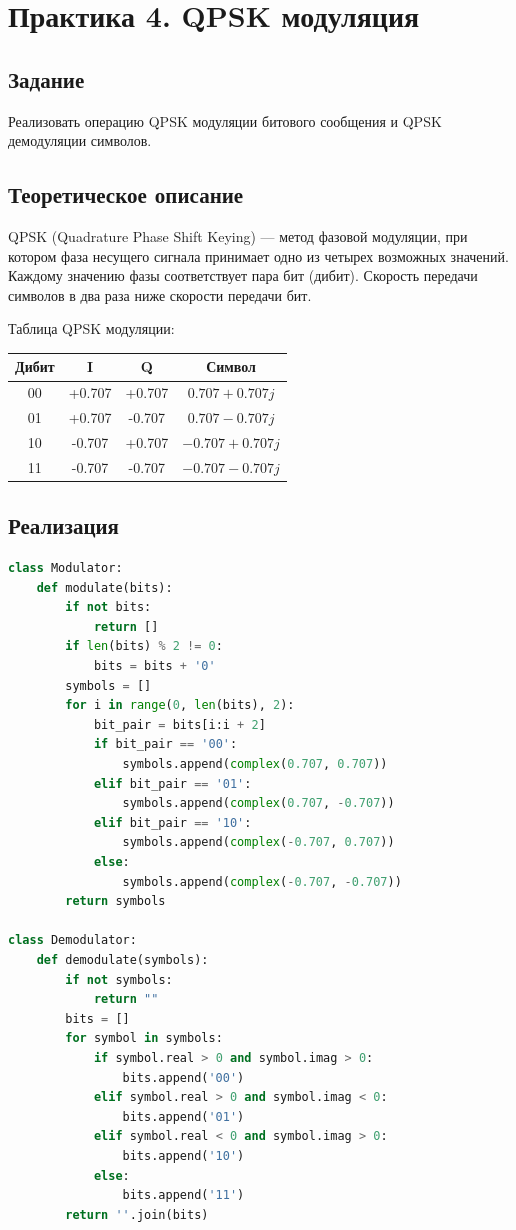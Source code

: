 \chapter{Практика 4. QPSK модуляция}

\section{Задание}
Реализовать операцию QPSK модуляции битового сообщения и QPSK демодуляции символов.

\section{Теоретическое описание}
QPSK (Quadrature Phase Shift Keying) — метод фазовой модуляции, при котором фаза несущего сигнала принимает одно из четырех возможных значений. Каждому значению фазы соответствует пара бит (дибит). Скорость передачи символов в два раза ниже скорости передачи бит.

Таблица QPSK модуляции:

\begin{center}
\begin{tabular}{|c|c|c|c|}
\hline
\textbf{Дибит} & \textbf{I} & \textbf{Q} & \textbf{Символ} \\
\hline
00 & +0.707 & +0.707 & $0.707 + 0.707j$ \\
01 & +0.707 & -0.707 & $0.707 - 0.707j$ \\
10 & -0.707 & +0.707 & $-0.707 + 0.707j$ \\
11 & -0.707 & -0.707 & $-0.707 - 0.707j$ \\
\hline
\end{tabular}
\end{center}

\section{Реализация}

\begin{lstlisting}[language=Python, caption=QPSK модулятор и демодулятор]
class Modulator:
    def modulate(bits):
        if not bits:
            return []
        if len(bits) % 2 != 0:
            bits = bits + '0'
        symbols = []
        for i in range(0, len(bits), 2):
            bit_pair = bits[i:i + 2]
            if bit_pair == '00':
                symbols.append(complex(0.707, 0.707))
            elif bit_pair == '01':
                symbols.append(complex(0.707, -0.707))
            elif bit_pair == '10':
                symbols.append(complex(-0.707, 0.707))
            else:
                symbols.append(complex(-0.707, -0.707))
        return symbols

class Demodulator:
    def demodulate(symbols):
        if not symbols:
            return ""
        bits = []
        for symbol in symbols:
            if symbol.real > 0 and symbol.imag > 0:
                bits.append('00')
            elif symbol.real > 0 and symbol.imag < 0:
                bits.append('01')
            elif symbol.real < 0 and symbol.imag > 0:
                bits.append('10')
            else:
                bits.append('11')
        return ''.join(bits)
\end{lstlisting}

